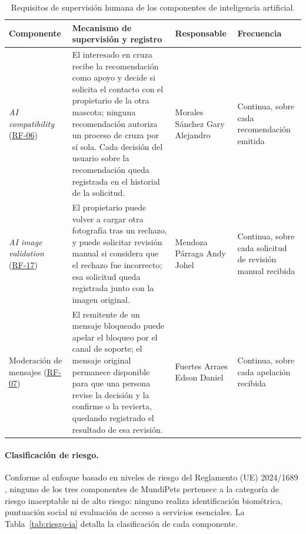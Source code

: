 \documentclass[journal,onecolumn]{IEEEtran}
\begin{document}
\begin{table}[H]
	\centering
	\caption{Requisitos de supervisión humana de los componentes de inteligencia artificial.}
	\label{tab:supervision-ia}
	\small
	\begin{tabularx}{\textwidth}{@{}p{1.9cm} X p{1.7cm} p{1.7cm}@{}}
		\toprule
		\textbf{Componente} & \textbf{Mecanismo de supervisión y registro} & \textbf{Responsable} & \textbf{Frecuencia} \\
		\midrule
		\emph{AI compatibility} (\hyperref[tab:RF-06]{RF-06}) & El interesado en cruza recibe la recomendación como apoyo y decide si solicita el contacto con el propietario de la otra mascota; ninguna recomendación autoriza un proceso de cruza por sí sola. Cada decisión del usuario sobre la recomendación queda registrada en el historial de la solicitud. & Morales Sánchez Gary Alejandro & Continua, sobre cada recomendación emitida \\
		\addlinespace
		\emph{AI image validation} (\hyperref[tab:RF-17]{RF-17}) & El propietario puede volver a cargar otra fotografía tras un rechazo, y puede solicitar revisión manual si considera que el rechazo fue incorrecto; esa solicitud queda registrada junto con la imagen original. & Mendoza Párraga Andy Johel & Continua, sobre cada solicitud de revisión manual recibida \\
		\addlinespace
		Moderación de mensajes (\hyperref[tab:RF-07]{RF-07}) & El remitente de un mensaje bloqueado puede apelar el bloqueo por el canal de soporte; el mensaje original permanece disponible para que una persona revise la decisión y la confirme o la revierta, quedando registrado el resultado de esa revisión. & Fuertes Arraes Edson Daniel & Continua, sobre cada apelación recibida \\
		\bottomrule
	\end{tabularx}
\end{table}

\paragraph{Clasificación de riesgo.}
Conforme al enfoque basado en niveles de riesgo del Reglamento (UE)
2024/1689 \cite{euaiact2024}, ninguno de los tres componentes de MundiPets
pertenece a la categoría de riesgo inaceptable ni de alto riesgo: ninguno
realiza identificación biométrica, puntuación social ni evaluación de
acceso a servicios esenciales. La Tabla~\ref{tab:riesgo-ia} detalla la
clasificación de cada componente.
\end{document}
